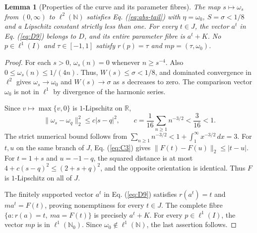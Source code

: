 \documentclass[11pt]{article}
\newcommand{\R}{\mathbb R}
\newcommand{\N}{\mathbb N}
\newcommand{\Nzero}{\mathbb N_0}
\newtheorem{lemma}{Lemma}
\theoremstyle{definition}
\theoremstyle{remark}
\begin{document}
\begin{lemma}[Properties of the curve and its parameter fibres]
\label{lem:coordinate-profile}
The map $s\mapsto\omega_s$ from $(0,\infty)$ to $\ell^2(\N)$ satisfies Eq. (\ref{eq:abs-tail}) with $\eta=\omega_0$, $S=\sigma<1/8$ and a Lipschitz constant strictly less than one. For every $t\in J$, the vector $a^t$ in Eq. (\ref{eq:D9}) belongs to $D$, and its entire parameter fibre is $a^t+K$. No $p\in\ell^1(I)$ and $\tau\in[-1,1]$ satisfy $r(p)=\tau$ and $mp=(\tau,\omega_0)$.
\end{lemma}
\begin{proof}
\label{sec:C2}
For each $s>0$, $\omega_s(n)=0$ whenever $n\ge s^{-4}$. Also $0\le\omega_s(n)\le1/(4n)$. Thus, $W(s)\le\sigma<1/8$, and dominated convergence in $\ell^2$ gives $\omega_s\to\omega_0$ and $W(s)\to\sigma$ as $s$ decreases to zero. The comparison vector $\omega_0$ is not in $\ell^1$ by divergence of the harmonic series.

Since $v\mapsto\max\{v,0\}$ is $1$-Lipschitz on $\R$,
\begin{equation}
\|\omega_s-\omega_q\|_2^2\le c|s-q|^2,\qquad
c=\frac1{16}\sum_{n\ge1}n^{-3/2}<\frac3{16}<1.
\label{eq:C3}
\end{equation}
The strict numerical bound follows from $\sum_{n\ge1}n^{-3/2}<1+\int_1^\infty x^{-3/2}\,dx=3$. For $t,u$ on the same branch of $J$, Eq. (\ref{eq:C3}) gives $\|F(t)-F(u)\|_2\le|t-u|$. For $t=1+s$ and $u=-1-q$, the squared distance is at most $4+c(s-q)^2\le(2+s+q)^2$, and the opposite orientation is identical. Thus $F$ is $1$-Lipschitz on all of $J$.

The finitely supported vector $a^t$ in Eq. (\ref{eq:D9}) satisfies $r(a^t)=t$ and $ma^t=F(t)$, proving nonemptiness for every $t\in J$. The complete fibre $\{a:r(a)=t,\ ma=F(t)\}$ is precisely $a^t+K$. For every $p\in\ell^1(I)$, the vector $mp$ is in $\ell^1(\Nzero)$. Since $\omega_0\notin\ell^1(\N)$, the last assertion follows.
\end{proof}
\end{document}
